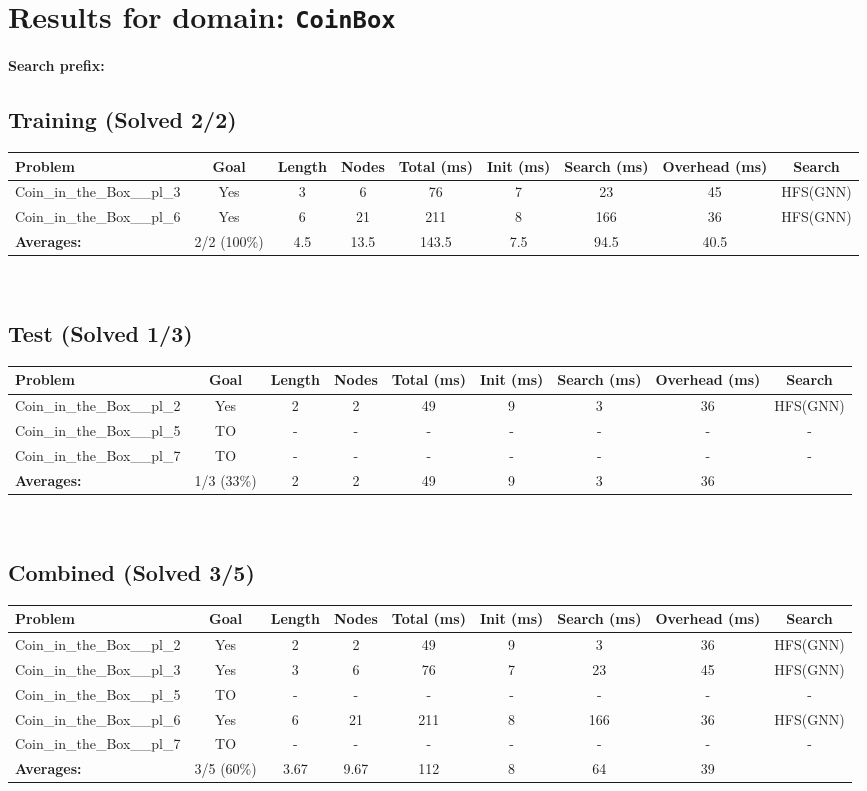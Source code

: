 \documentclass{article}
\begin{document}
\section*{Results for domain: \texttt{CoinBox}}
\textbf{Search prefix:} 
\\[0.5cm]
\subsection*{Training (Solved 2/2)}
\begin{tabular}{lcccccccc}
\toprule
Problem & Goal & Length & Nodes & Total (ms) & Init (ms) & Search (ms) & Overhead (ms) & Search \\
\midrule
Coin\_in\_the\_Box\_\_pl\_3 & Yes & 3 & 6 & 76 & 7 & 23 & 45 & HFS(GNN) \\
Coin\_in\_the\_Box\_\_pl\_6 & Yes & 6 & 21 & 211 & 8 & 166 & 36 & HFS(GNN) \\
\textbf{Averages:} & 2/2 (100\%) & 4.5 & 13.5 & 143.5 & 7.5 & 94.5 & 40.5 & \\
\bottomrule
\end{tabular}
\\[0.7cm]
\subsection*{Test (Solved 1/3)}
\begin{tabular}{lcccccccc}
\toprule
Problem & Goal & Length & Nodes & Total (ms) & Init (ms) & Search (ms) & Overhead (ms) & Search \\
\midrule
Coin\_in\_the\_Box\_\_pl\_2 & Yes & 2 & 2 & 49 & 9 & 3 & 36 & HFS(GNN) \\
Coin\_in\_the\_Box\_\_pl\_5 & TO & - & - & - & - & - & - & - \\
Coin\_in\_the\_Box\_\_pl\_7 & TO & - & - & - & - & - & - & - \\
\textbf{Averages:} & 1/3 (33\%) & 2 & 2 & 49 & 9 & 3 & 36 & \\
\bottomrule
\end{tabular}
\\[0.7cm]
\subsection*{Combined (Solved 3/5)}
\begin{tabular}{lcccccccc}
\toprule
Problem & Goal & Length & Nodes & Total (ms) & Init (ms) & Search (ms) & Overhead (ms) & Search \\
\midrule
Coin\_in\_the\_Box\_\_pl\_2 & Yes & 2 & 2 & 49 & 9 & 3 & 36 & HFS(GNN) \\
Coin\_in\_the\_Box\_\_pl\_3 & Yes & 3 & 6 & 76 & 7 & 23 & 45 & HFS(GNN) \\
Coin\_in\_the\_Box\_\_pl\_5 & TO & - & - & - & - & - & - & - \\
Coin\_in\_the\_Box\_\_pl\_6 & Yes & 6 & 21 & 211 & 8 & 166 & 36 & HFS(GNN) \\
Coin\_in\_the\_Box\_\_pl\_7 & TO & - & - & - & - & - & - & - \\
\textbf{Averages:} & 3/5 (60\%) & 3.67 & 9.67 & 112 & 8 & 64 & 39 & \\
\bottomrule
\end{tabular}
\\[0.7cm]
\end{document}
